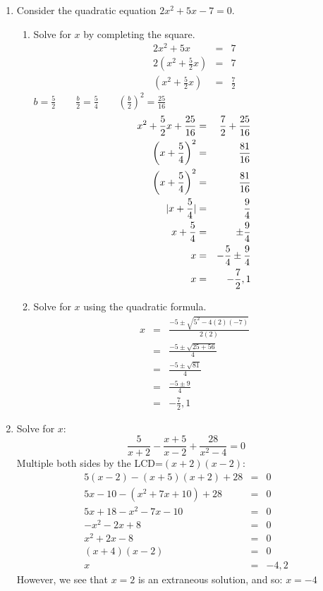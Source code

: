 \documentclass[letterpaper,12pt,fleqn]{article}
\begin{document}
\begin{enumerate}
\item Consider the quadratic equation $2x^2+5x-7=0$.
  \begin{enumerate}
  \item Solve for $x$ by completing the square.
    \begin{eqnarray*}
      2x^2+5x &=& 7 \\
      2\left(x^2+\frac{5}{2}x\right) &=& 7 \\
      \left(x^2+\frac{5}{2}x\right) &=& \frac{7}{2}
    \end{eqnarray*}
    $b=\frac{5}{2}\qquad\frac{b}{2}=\frac{5}{4}\qquad
    \left(\frac{b}{2}\right)^2=\frac{25}{16}$ \\
    \begin{eqnarray*}
      x^2+\frac{5}{2}x+\frac{25}{16} &=& \frac{7}{2}+\frac{25}{16} \\
      \left(x+\frac{5}{4}\right)^2 &=& \frac{81}{16} \\
      \left(x+\frac{5}{4}\right)^2 &=& \frac{81}{16} \\
      \lvert x+\frac{5}{4}\rvert &=& \frac{9}{4} \\
      x+\frac{5}{4} &=& \pm\frac{9}{4} \\
      x &=& -\frac{5}{4}\pm\frac{9}{4} \\
      x &=& -\frac{7}{2}, 1
    \end{eqnarray*}

  \item Solve for $x$ using the quadratic formula.
    \begin{eqnarray*}
      x &=& \frac{-5\pm\sqrt{5^2-4(2)(-7)}}{2(2)} \\
      &=& \frac{-5\pm\sqrt{25+56}}{4} \\
      &=& \frac{-5\pm\sqrt{81}}{4} \\
      &=& \frac{-5\pm9}{4} \\
      &=& -\frac{7}{2}, 1
    \end{eqnarray*}
  \end{enumerate}

\item Solve for $x$:
  \[\frac{5}{x+2}-\frac{x+5}{x-2}+\frac{28}{x^2-4}=0\]
  Multiple both sides by the LCD=$(x+2)(x-2)$:
  \begin{eqnarray*}
    5(x-2)-(x+5)(x+2)+28 &=& 0 \\
    5x-10-(x^2+7x+10)+28 &=& 0 \\
    5x+18-x^2-7x-10 &=& 0 \\
    -x^2-2x+8 &=& 0 \\
    x^2+2x-8 &=& 0 \\
    (x+4)(x-2) &=& 0 \\
    x &=& -4,2
  \end{eqnarray*}
  However, we see that $x=2$ is an extraneous solution, and so:
  $x=-4$


\end{enumerate}
\end{document}
